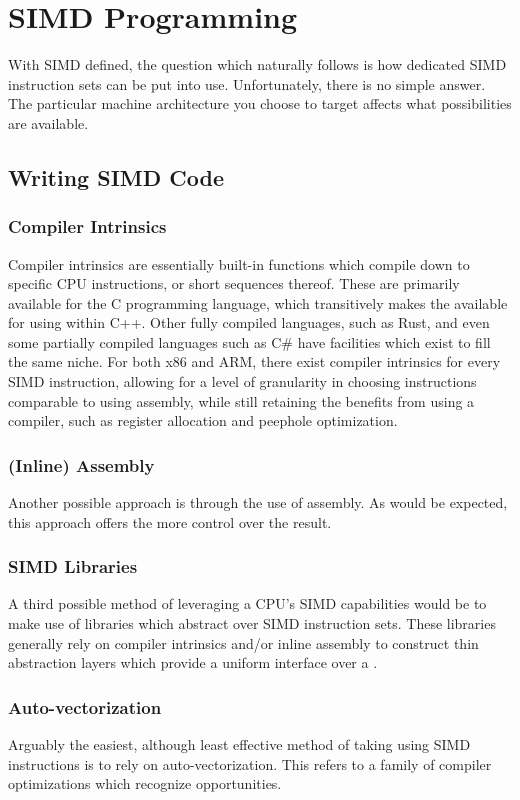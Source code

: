 \chapter{SIMD Programming}

With SIMD defined, the question which naturally follows is how dedicated SIMD
instruction sets can be put into use. Unfortunately, there is no simple answer.
The particular machine architecture you choose to target affects what
possibilities are available. 


\section{Writing SIMD Code}

\subsection{Compiler Intrinsics}
Compiler intrinsics are essentially built-in functions which compile down to
specific CPU instructions, or short sequences thereof. These are primarily
available for the C programming language, which transitively makes the available
for using within C++. Other fully compiled languages, such as Rust, and even
some partially compiled languages such as C\# have facilities which exist to
fill the same niche. For both x86 and ARM, there exist compiler intrinsics for
every SIMD instruction, allowing for a level of granularity in choosing
instructions comparable to using assembly, while still retaining the benefits
from using a compiler, such as register allocation and peephole optimization.

\subsection{(Inline) Assembly}
Another possible approach is through the use of assembly. As would be expected,
this approach offers the more control over the result. 

\subsection{SIMD Libraries}
A third possible method of leveraging a CPU's SIMD capabilities would be to make
use of libraries which abstract over SIMD instruction sets. These libraries
generally rely on compiler intrinsics and/or inline assembly to construct thin
abstraction layers which provide a uniform interface over a .

\subsection{Auto-vectorization}
Arguably the easiest, although least effective method of taking using SIMD
instructions is to rely on auto-vectorization. This refers to a family of
compiler optimizations which recognize opportunities.

